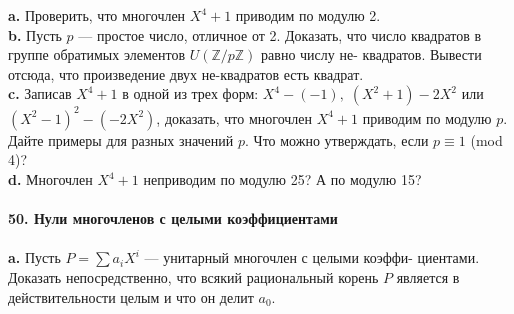 \documentclass{mai_book}
\begin{document}
\hspace*{10pt}\textbf{a.} Проверить, что многочлен $X^4+1$ приводим по модулю 2.\\
\hspace*{10pt}\textbf{b.} Пусть $p$ — простое число, отличное от 2. Доказать, что число\linebreak
квадратов в группе обратимых элементов $U(\mathbb{Z}/p\mathbb{Z})$ равно числу не-\linebreak
квадратов. Вывести отсюда, что произведение двух не-квадратов есть\linebreak
квадрат.\\
\hspace*{10pt}\textbf{c.} Записав $X^4+1$ в одной из трех форм: $X^4-(-1),\;(X^2+1)-2X^2$ или\linebreak
$(X^2-1)^2-(-2X^2)$, доказать, что многочлен $X^4+1$ приводим по модулю\linebreak
$p$. Дайте примеры для разных значений $p$. Что можно утверждать, если\linebreak
$p \equiv 1$ (mod 4)?\\
\hspace*{10pt}\textbf{d.} Многочлен $X^4+1$ неприводим по модулю 25? А по модулю 15?
\\
\\
\noindent\textbf{50. Нули многочленов с целыми коэффициентами}\\\\
\hspace*{10pt}\textbf{a.} Пусть $P=\sum a_iX^i$ — унитарный многочлен с целыми коэффи-\linebreak
циентами. Доказать непосредственно, что всякий рациональный корень\linebreak
$P$ является в действительности целым и что он делит $a_0$.\pagebreak

\end{document}
